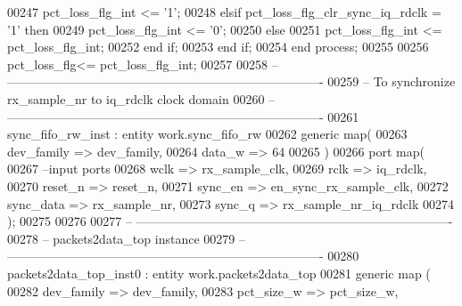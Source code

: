 \begin{DoxyCode}
00247          \textcolor{vhdlchar}{pct_loss_flg_int} \textcolor{vhdlchar}{<=} \textcolor{vhdlchar}{'}\textcolor{vhdllogic}{}\textcolor{vhdllogic}{1}\textcolor{vhdlchar}{'};
00248       \textcolor{keywordflow}{elsif} \textcolor{vhdlchar}{pct_loss_flg_clr_sync_iq_rdclk} \textcolor{vhdlchar}{=} \textcolor{vhdlchar}{'}\textcolor{vhdllogic}{}\textcolor{vhdllogic}{1}\textcolor{vhdlchar}{'} \textcolor{keywordflow}{then} 
00249          \textcolor{vhdlchar}{pct_loss_flg_int} \textcolor{vhdlchar}{<=} \textcolor{vhdlchar}{'}\textcolor{vhdllogic}{}\textcolor{vhdllogic}{0}\textcolor{vhdlchar}{'};
00250       \textcolor{keywordflow}{else} 
00251          \textcolor{vhdlchar}{pct_loss_flg_int} \textcolor{vhdlchar}{<=} \textcolor{vhdlchar}{pct_loss_flg_int};
00252       \textcolor{keywordflow}{end} \textcolor{keywordflow}{if};
00253    \textcolor{keywordflow}{end} \textcolor{keywordflow}{if};
00254  \textcolor{keywordflow}{end} \textcolor{keywordflow}{process};
00255 
00256 \textcolor{vhdlchar}{pct_loss_flg}\textcolor{vhdlchar}{<=} \textcolor{vhdlchar}{pct_loss_flg_int};
00257 
00258 \textcolor{keyword}{-- ----------------------------------------------------------------------------}
00259 \textcolor{keyword}{-- To synchronize rx\_sample\_nr to iq\_rdclk clock domain}
00260 \textcolor{keyword}{-- ----------------------------------------------------------------------------}
00261 sync\_fifo\_rw\_inst : \textcolor{keywordflow}{entity} work.sync_fifo_rw
00262 \textcolor{keywordflow}{generic} \textcolor{keywordflow}{map}( 
00263    dev_family  => dev_family,
00264    data_w      => \textcolor{vhdllogic}{64}
00265   \textcolor{vhdlchar}{)}
00266   \textcolor{keywordflow}{port} \textcolor{keywordflow}{map}(
00267 \textcolor{keyword}{        --input ports }
00268         wclk         => rx_sample_clk,      
00269         rclk         => iq_rdclk,
00270         reset_n      => reset_n,
00271         sync_en      => en_sync_rx_sample_clk,
00272         sync_data    => rx_sample_nr,
00273         sync_q       => rx_sample_nr_iq_rdclk
00274         \textcolor{vhdlchar}{)};
00275 
00276 
00277 \textcolor{keyword}{-- ----------------------------------------------------------------------------}
00278 \textcolor{keyword}{-- packets2data\_top instance}
00279 \textcolor{keyword}{-- ----------------------------------------------------------------------------}
00280   packets2data\_top\_inst0 : \textcolor{keywordflow}{entity} work.packets2data_top
00281    \textcolor{keywordflow}{generic} \textcolor{keywordflow}{map} (
00282       dev_family        => dev_family,
00283       pct_size_w        => pct_size_w,

\end{DoxyCode}
